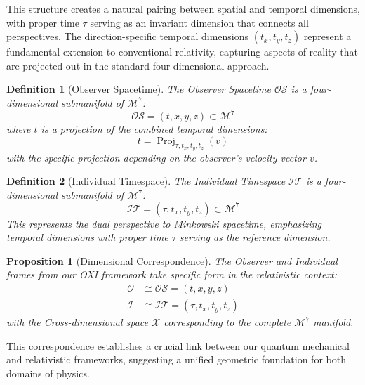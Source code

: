 \documentclass{article}
\newtheorem{definition}{Definition}
\newtheorem{proposition}{Proposition}
\DeclareMathOperator{\Proj}{Proj}
\begin{document}
This structure creates a natural pairing between spatial and temporal dimensions, with proper time $\tau$ serving as an invariant dimension that connects all perspectives. The direction-specific temporal dimensions $(t_x, t_y, t_z)$ represent a fundamental extension to conventional relativity, capturing aspects of reality that are projected out in the standard four-dimensional approach.

\begin{definition}[Observer Spacetime]
The Observer Spacetime $\mathcal{OS}$ is a four-dimensional submanifold of $\mathcal{M}^7$:
\begin{equation}
\mathcal{OS} = (t, x, y, z) \subset \mathcal{M}^7
\end{equation}
where $t$ is a projection of the combined temporal dimensions:
\begin{equation}
t = \Proj_{\tau, t_x, t_y, t_z}(v)
\end{equation}
with the specific projection depending on the observer's velocity vector $v$.
\end{definition}

\begin{definition}[Individual Timespace]
The Individual Timespace $\mathcal{IT}$ is a four-dimensional submanifold of $\mathcal{M}^7$:
\begin{equation}
\mathcal{IT} = (\tau, t_x, t_y, t_z) \subset \mathcal{M}^7
\end{equation}
This represents the dual perspective to Minkowski spacetime, emphasizing temporal dimensions with proper time $\tau$ serving as the reference dimension.
\end{definition}

\begin{proposition}[Dimensional Correspondence]
The Observer and Individual frames from our OXI framework take specific form in the relativistic context:
\begin{align}
\mathcal{O} &\cong \mathcal{OS} = (t, x, y, z) \\
\mathcal{I} &\cong \mathcal{IT} = (\tau, t_x, t_y, t_z)
\end{align}
with the Cross-dimensional space $\mathcal{X}$ corresponding to the complete $\mathcal{M}^7$ manifold.
\end{proposition}

This correspondence establishes a crucial link between our quantum mechanical and relativistic frameworks, suggesting a unified geometric foundation for both domains of physics.
\end{document}
